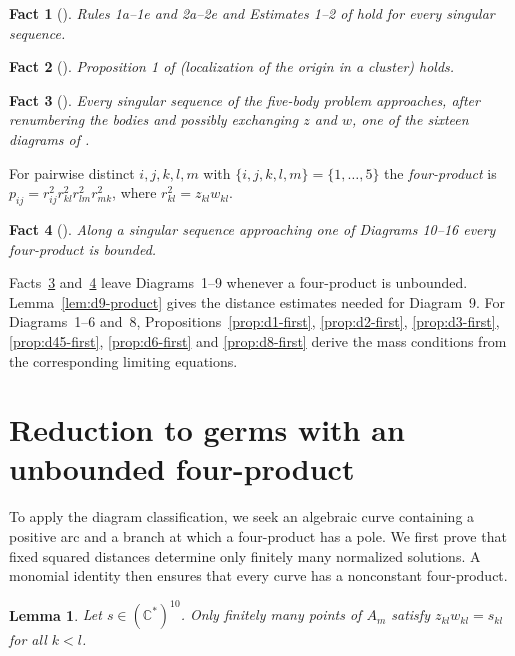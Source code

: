 \documentclass[Threeside,11pt]{article}
\newtheorem{lemma}[theorem]{Lemma}
\newtheorem{fact}{Fact}
\theoremstyle{definition}
\theoremstyle{remark}
\numberwithin{equation}{section}
\newcommand{\C}{\mathbb C}\newcommand{\T}{\mathbb T}
\theoremstyle{remark}
\begin{document}
\begin{fact}[{\cite[\S3]{AK}}]\label{fact:rules}
Rules 1a--1e and 2a--2e and Estimates 1--2 of \cite[\S3]{AK} hold for every singular sequence.
\end{fact}

\begin{fact}[{\cite[Prop.~1]{AK}}]\label{fact:prop1}
Proposition 1 of \cite{AK} (localization of the origin in a cluster) holds.
\end{fact}

\begin{fact}[{\cite[\S7]{AK}}]\label{fact:fig11}
Every singular sequence of the five-body problem approaches, after renumbering the bodies and
possibly exchanging $z$ and $w$, one of the sixteen diagrams of \cite[Fig.~11]{AK}.
\end{fact}

For pairwise distinct $i,j,k,l,m$ with $\{i,j,k,l,m\}=\{1,\dots,5\}$ the \emph{four-product} is
$p_{ij}=r_{ij}^2r_{kl}^2r_{lm}^2r_{mk}^2$, where $r_{kl}^2=z_{kl}w_{kl}$.

\begin{fact}[{\cite[Prop.~8]{AK}}]\label{fact:prop8}
Along a singular sequence approaching one of Diagrams 10--16 every four-product is bounded.
\end{fact}

Facts~\ref{fact:fig11} and~\ref{fact:prop8} leave Diagrams~1--9 whenever a four-product is
unbounded.  Lemma~\ref{lem:d9-product} gives the distance estimates needed for Diagram~9.
For Diagrams~1--6 and~8, Propositions~\ref{prop:d1-first}, \ref{prop:d2-first},
\ref{prop:d3-first}, \ref{prop:d45-first}, \ref{prop:d6-first} and \ref{prop:d8-first}
derive the mass conditions from the corresponding limiting equations.


\section{Reduction to germs with an unbounded four-product}\label{sec:reduction}

To apply the diagram classification, we seek an algebraic curve containing a positive arc
and a branch at which a four-product has a pole.  We first prove that fixed squared
distances determine only finitely many normalized solutions.  A monomial identity then
ensures that every curve has a nonconstant four-product.

\begin{lemma}\label{lem:distances}
Let $s\in(\C^*)^{10}$.  Only finitely many points of $A_m$ satisfy $z_{kl}w_{kl}=s_{kl}$ for all
$k<l$.
\end{lemma}
\end{document}
